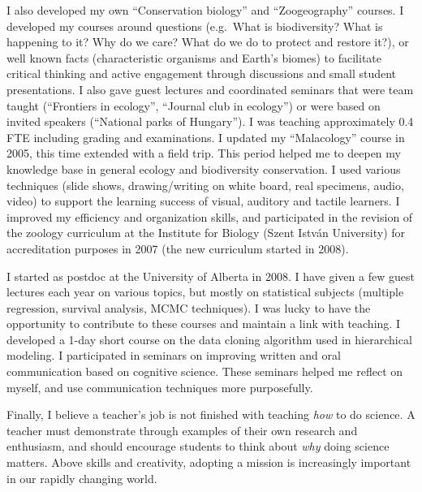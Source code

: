 I also developed my own ``Conservation biology'' and ``Zoogeography'' courses. I developed my courses around questions (e.g.~What is biodiversity? What is happening to it? Why do we care? What do we do to protect and restore it?), or well known facts (characteristic organisms and Earth's biomes) to facilitate critical thinking and active engagement through discussions and small student presentations. I also gave guest lectures and coordinated seminars that were team taught (``Frontiers in ecology'', ``Journal club in ecology'') or were based on invited speakers (``National parks of Hungary''). I was teaching approximately 0.4 FTE including grading and examinations. I updated my ``Malacology'' course in 2005, this time extended with a field trip. This period helped me to deepen my knowledge base in general ecology and biodiversity conservation. I used various techniques (slide shows, drawing/writing on white board, real specimens, audio, video) to support the learning success of visual, auditory and tactile learners. I improved my efficiency and organization skills, and participated in the revision of the zoology curriculum at the Institute for Biology (Szent Istv\'{a}n University) for accreditation purposes in 2007 (the new curriculum started in 2008).
\vspace{0.5pc}

I started as postdoc at the University of Alberta in 2008. I have given a few guest lectures each year on various topics, but mostly on statistical subjects (multiple regression, survival analysis, MCMC techniques). I was lucky to have the opportunity to contribute to these courses and maintain a link with teaching. I developed a 1-day short course on the data cloning algorithm used in hierarchical modeling. I participated in seminars on improving written and oral communication based on cognitive science. These seminars helped me reflect on myself, and use communication techniques more purposefully.
\vspace{0.5pc}

Finally, I believe a teacher's job is not finished with teaching \emph{how} to do science. A teacher must demonstrate through examples of their own research and enthusiasm, and should encourage students to think about \emph{why} doing science matters. Above skills and creativity, adopting a mission is increasingly important in our rapidly changing world.

